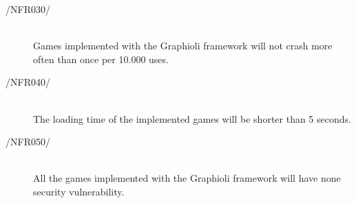 \vspace{.5cm}

\begin{description}
	\item[/NFR030/\label{NFR:030}] {\bf {}}  \\
	Games implemented with the Graphioli framework will not crash more often than once per 10.000 uses. \\
	\item[/NFR040/\label{NFR:040}] {\bf {}} \\
	The loading time of the implemented games will be shorter than 5 seconds. \\
	\item[/NFR050/\label{NFR:050}] {\bf {}} \\
	All the games implemented with the Graphioli framework will have none security vulnerability.
\end{description}